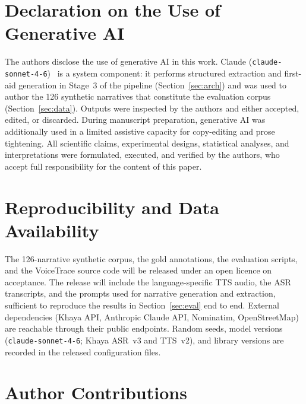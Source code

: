 \documentclass[conference]{IEEEtran}
\begin{document}
\section*{Declaration on the Use of Generative AI}

The authors disclose the use of generative AI in this work. Claude
(\texttt{claude-sonnet-4-6})~\cite{anthropic2024} is a system
component: it performs structured extraction and first-aid generation
in Stage~3 of the pipeline (Section~\ref{sec:arch}) and was used to
author the 126 synthetic narratives that constitute the evaluation
corpus (Section~\ref{sec:data}). Outputs were inspected by the
authors and either accepted, edited, or discarded. During manuscript
preparation, generative AI was additionally used in a limited
assistive capacity for copy-editing and prose tightening. All
scientific claims, experimental designs, statistical analyses, and
interpretations were formulated, executed, and verified by the
authors, who accept full responsibility for the content of this
paper.


\section*{Reproducibility and Data Availability}
\label{sec:repro}

The 126-narrative synthetic corpus, the gold annotations, the
evaluation scripts, and the VoiceTrace source code will be released
under an open licence on acceptance. The release will include the
language-specific TTS audio, the ASR transcripts, and the prompts
used for narrative generation and extraction, sufficient to
reproduce the results in Section~\ref{sec:eval} end to end. External
dependencies (Khaya API, Anthropic Claude API, Nominatim,
OpenStreetMap) are reachable through their public endpoints. Random
seeds, model versions (\texttt{claude-sonnet-4-6}; Khaya ASR~v3 and
TTS~v2), and library versions are recorded in the released
configuration files.


\section*{Author Contributions}
\end{document}
